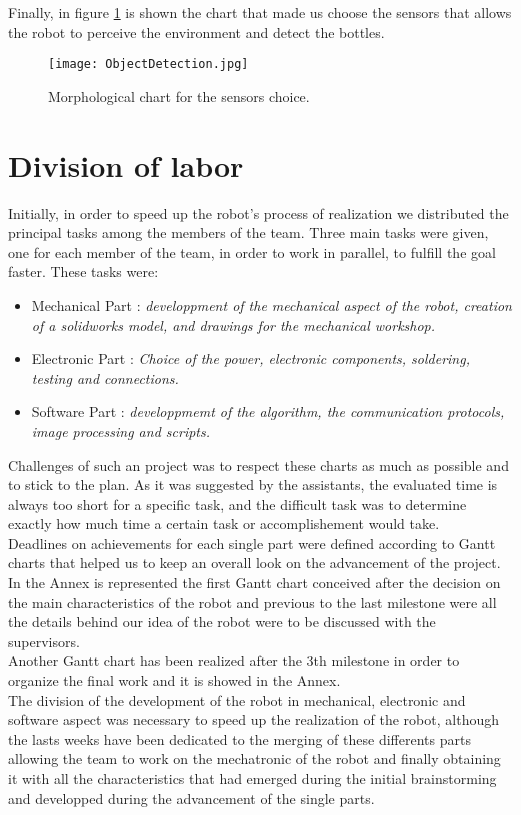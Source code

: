 Finally, in figure \ref{fig:ObjectDetection} is shown the chart that made us choose the sensors that allows the robot to perceive the environment and detect the bottles.                                                
\begin{figure}[H]
 \centering
 \texttt{[image: ObjectDetection.jpg]}
 \caption{Morphological chart for the sensors choice.}
\label{fig:ObjectDetection}
\end{figure}

\section{Division of labor}
Initially, in order to speed up the robot’s process of realization we distributed the principal tasks among the members of the team.
Three main tasks were given, one for each member of the team, in order to work in parallel, to fulfill the goal faster. These tasks were:

\begin{itemize}
\item Mechanical Part : \textit{developpment of the mechanical aspect of the robot, creation of a solidworks model, and drawings for the mechanical workshop.}
\item Electronic Part : \textit{Choice of the power, electronic components, soldering, testing and connections.}
\item Software Part : \textit{developpmemt of the algorithm, the communication protocols, image processing and scripts.}
\end{itemize}

Challenges of such an project was to respect these charts as much as possible and to stick to the plan. As it was suggested by the assistants, the evaluated time is always too short for a specific task, and the  difficult task was to determine exactly how much time a certain task or accomplishement would take. \\

Deadlines on achievements for each single part were defined according to Gantt charts that helped us to keep an overall look on the advancement of the project.
In the Annex is represented the first Gantt chart conceived after the decision on the main characteristics of the robot and previous to the last milestone were all the details behind our idea of the robot were to be discussed with the supervisors.\\

Another Gantt chart has been realized after the 3th milestone in order to organize the final work and it is showed in the Annex.\\

The division of the development of the robot in mechanical, electronic and software aspect was necessary to speed up the realization of the robot, although the lasts weeks have been dedicated to the merging of these differents parts allowing the team to work on the mechatronic of the robot and finally obtaining it with all the characteristics that had emerged during the initial brainstorming and developped during the advancement of the single parts.